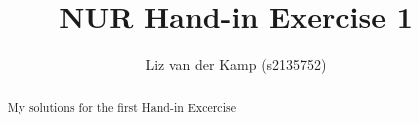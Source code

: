 \documentclass[a4paper,10pt]{article}
\title{NUR Hand-in Exercise 1}
\author{Liz van der Kamp (s2135752)}
\begin{document}
\maketitle

\begin{abstract}
 My solutions for the first Hand-in Excercise
\end{abstract}




\end{document}
